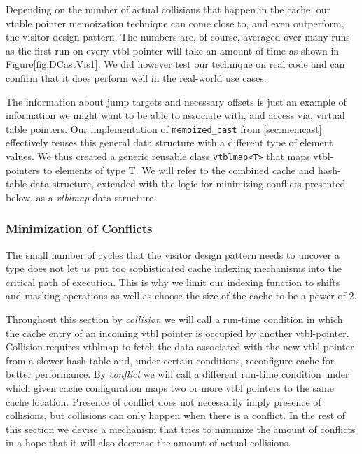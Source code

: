 \documentclass[preprint]{sigplanconf}
\makeatletter
\DeclareRobustCommand{\code}[1]{{\lstinline[breaklines=false,escapechar=@]{#1}}}
\makeatother
\begin{document}
Depending on the number of actual collisions that happen in the cache, our 
vtable pointer memoization technique can come close to, and even outperform, the 
visitor design pattern. The numbers are, of course, averaged over many runs as 
the first run on every vtbl-pointer will take an amount of time as shown in 
Figure\ref{fig:DCastVis1}. We did however test our technique on real code and 
can confirm that it does perform well in the real-world use cases.

The information about jump targets and necessary offsets is just an example of 
information we might want to be able to associate with, and access via, virtual 
table pointers. Our implementation of \code{memoized_cast} from 
\textsection\ref{sec:memcast} effectively reuses this general data structure with 
a different type of element values. We thus created a generic reusable class 
\code{vtblmap<T>} that maps vtbl-pointers to elements of type T. We will refer 
to the combined cache and hash-table data structure, extended with the logic for 
minimizing conflicts presented below, as a \emph{vtblmap} data structure.

\subsubsection{Minimization of Conflicts}
\label{sec:moc}

The small number of cycles that the visitor design pattern needs to uncover a 
type does not let us put too sophisticated cache indexing mechanisms into the 
critical path of execution. This is why we limit our indexing function to shifts 
and masking operations as well as choose the size of the cache to be a power of 2.

Throughout this section by \emph{collision} we will call a run-time condition in 
which the cache entry of an incoming vtbl pointer is occupied by another vtbl-pointer.
Collision requires vtblmap to fetch the data associated with the new 
vtbl-pointer from a slower hash-table and, under certain conditions, reconfigure 
cache for better performance. By \emph{conflict} we will call a different 
run-time condition under which given cache configuration maps two or more vtbl 
pointers to the same cache location. Presence of conflict does not necessarily 
imply presence of collisions, but collisions can only happen when there is a 
conflict. In the rest of this section we devise a mechanism that tries to 
minimize the amount of conflicts in a hope that it will also decrease the amount 
of actual collisions.
\end{document}
